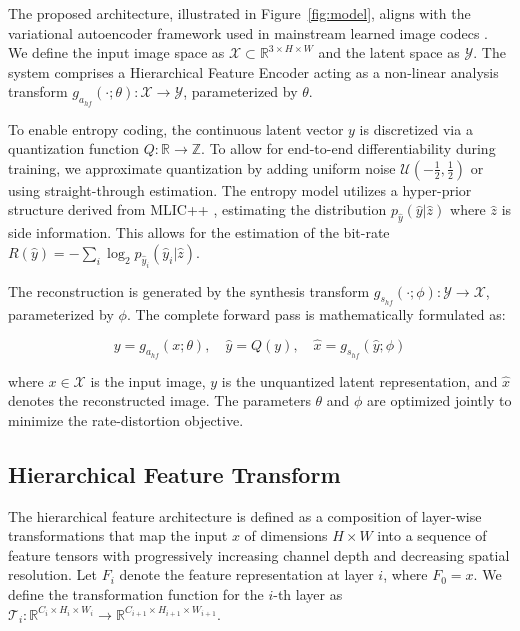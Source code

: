 \documentclass{article}
\begin{document}
The proposed architecture, illustrated in Figure~\ref{fig:model}, aligns with the variational autoencoder framework used in mainstream learned image codecs \cite{jiangMLICLinearComplexity2024,chengLearnedImageCompression2020}. We define the input image space as $\mathcal{X} \subset \mathbb{R}^{3 \times H \times W}$ and the latent space as $\mathcal{Y}$. The system comprises a Hierarchical Feature Encoder acting as a non-linear analysis transform $g_{a_{hf}}(\cdot; \theta)\colon \mathcal{X} \to \mathcal{Y}$, parameterized by $\theta$.

To enable entropy coding, the continuous latent vector $y$ is discretized via a quantization function $Q\colon \mathbb{R} \to \mathbb{Z}$. To allow for end-to-end differentiability during training, we approximate quantization by adding uniform noise $\mathcal{U}(-\frac{1}{2}, \frac{1}{2})$ or using straight-through estimation. The entropy model utilizes a hyper-prior structure derived from MLIC++ \cite{jiangMLICLinearComplexity2024}, estimating the distribution $p_{\hat{y}}(\hat{y} | \hat{z})$ where $\hat{z}$ is side information. This allows for the estimation of the bit-rate $R(\hat{y}) = -\sum_i \log_2 p_{\hat{y}_i}(\hat{y}_i | \hat{z})$.

The reconstruction is generated by the synthesis transform $g_{s_{hf}}(\cdot; \phi)\colon \mathcal{Y} \to \mathcal{X}$, parameterized by $\phi$. The complete forward pass is mathematically formulated as:

\begin{equation}
y = g_{a_{hf}}(x; \theta), \quad \hat{y} = Q(y), \quad \hat{x} = g_{s_{hf}}(\hat{y}; \phi)
\end{equation}

where $x \in \mathcal{X}$ is the input image, $y$ is the unquantized latent representation, and $\hat{x}$ denotes the reconstructed image. The parameters $\theta$ and $\phi$ are optimized jointly to minimize the rate-distortion objective.

\subsection{Hierarchical Feature Transform}

The hierarchical feature architecture \cite{meyer2023,meyer2025} is defined as a composition of layer-wise transformations that map the input $x$ of dimensions $H \times W$ into a sequence of feature tensors with progressively increasing channel depth and decreasing spatial resolution. Let $F_i$ denote the feature representation at layer $i$, where $F_0 = x$. We define the transformation function for the $i$-th layer as $\mathcal{T}_i\colon \mathbb{R}^{C_i \times H_i \times W_i} \to \mathbb{R}^{C_{i+1} \times H_{i+1} \times W_{i+1}}$.
\end{document}
